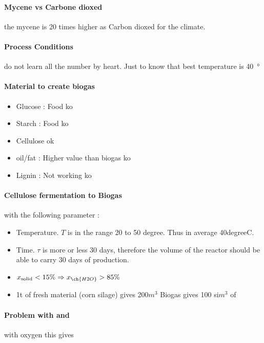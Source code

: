 \documentclass[10pt,a4paper]{article}
\begin{document}
\paragraph{Mycene vs Carbone dioxed} the mycene is 20 times higher as Carbon dioxed for the climate.

\paragraph{Process Conditions} do not learn all the number by heart. Just to know that best temperature is \SI{40}{\degree}
\paragraph{Material to create biogas}
\begin{itemize}
\item Glucose : Food {\color{red}ko}
\item Starch : Food {\color{red}ko}
\item Cellulose {\color{green}ok}
\item oil/fat : Higher value than biogas {\color{red}ko}
\item Lignin : Not working {\color{red}ko}
\end{itemize}

\paragraph{Cellulose fermentation to Biogas}

with the following parameter :

\begin{itemize}
\item Temperature. $T$ is in the range 20 to 50 degree. Thus in average 40\si{degree}C.
\item Time. $\tau$ is more or less 30 days, therefore the volume of the reactor should be able to carry 30 days of production.
\item $x_{\text{solid}} < 15 \% \Rightarrow x_{\ch{H2O}}> 85 \%$
\item 1t of fresh material (corn silage) gives 200$m^3$ Biogas gives 100 si$m^3$ of 
\end{itemize}

\paragraph{Problem with  and } with oxygen this gives
\end{document}
